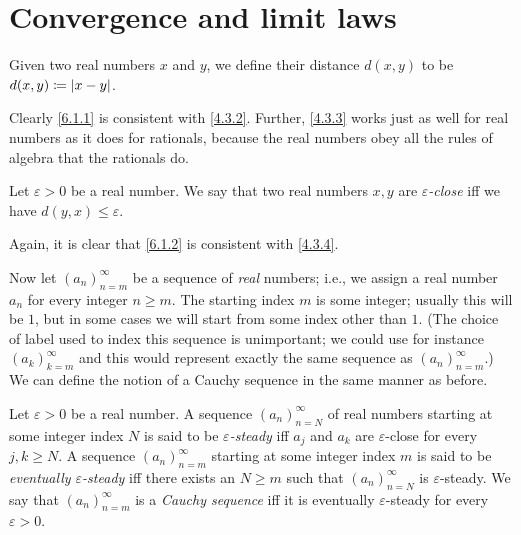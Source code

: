 \section{Convergence and limit laws}\label{sec:6.1}

\begin{defn}\label{6.1.1}
  Given two real numbers \(x\) and \(y\), we define their distance \(d(x, y)\) to be \(d(x, y) \coloneqq \left\lvert x - y\right\rvert\).
\end{defn}

\begin{note}
  Clearly \cref{6.1.1} is consistent with \cref{4.3.2}.
  Further, \cref{4.3.3} works just as well for real numbers as it does for rationals, because the real numbers obey all the rules of algebra that the rationals do.
\end{note}

\begin{defn}\label{6.1.2}
  Let \(\varepsilon > 0\) be a real number.
  We say that two real numbers \(x, y\) are \emph{\(\varepsilon\)-close} iff we have \(d(y, x) \leq \varepsilon\).
\end{defn}

\begin{note}
  Again, it is clear that \cref{6.1.2} is consistent with \cref{4.3.4}.
\end{note}

\begin{note}
  Now let \((a_n)_{n = m}^\infty\) be a sequence of \emph{real} numbers;
  i.e., we assign a real number \(a_n\) for every integer \(n \geq m\).
  The starting index \(m\) is some integer;
  usually this will be \(1\), but in some cases we will start from some index other than \(1\).
  (The choice of label used to index this sequence is unimportant; we could use for instance \((a_k)_{k = m}^{\infty}\) and this would represent exactly the same sequence as \((a_n)_{n = m}^{\infty}\).)
  We can define the notion of a Cauchy sequence in the same manner as before.
\end{note}

\begin{defn}\label{6.1.3}
  Let \(\varepsilon > 0\) be a real number.
  A sequence \((a_n)_{n = N}^\infty\) of real numbers starting at some integer index \(N\) is said to be \emph{\(\varepsilon\)-steady} iff \(a_j\) and \(a_k\) are \(\varepsilon\)-close for every \(j, k \geq N\).
  A sequence \((a_n)_{n = m}^\infty\) starting at some integer index \(m\) is said to be \emph{eventually \(\varepsilon\)-steady} iff there exists an \(N \geq m\) such that \((a_n)_{n = N}^\infty\) is \(\varepsilon\)-steady.
  We say that \((a_n)_{n = m}^\infty\) is a \emph{Cauchy sequence} iff it is eventually \(\varepsilon\)-steady for every \(\varepsilon > 0\).
\end{defn}


